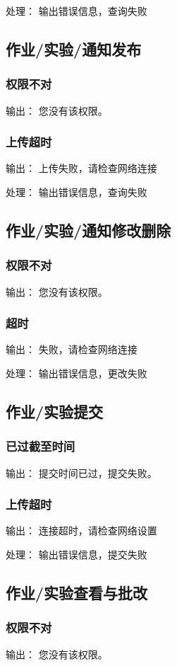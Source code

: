 处理： 输出错误信息，查询失败

\subsection{作业/实验/通知发布}
\subsubsection{权限不对}
输出： 您没有该权限。
\subsubsection{上传超时}
输出： 上传失败，请检查网络连接

处理： 输出错误信息，查询失败

\subsection{作业/实验/通知修改删除}
\subsubsection{权限不对}
输出： 您没有该权限。
\subsubsection{超时}
输出： 失败，请检查网络连接

处理： 输出错误信息，更改失败

\subsection{作业/实验提交}
\subsubsection{已过截至时间}
输出： 提交时间已过，提交失败。
\subsubsection{上传超时}
输出： 连接超时，请检查网络设置

处理： 输出错误信息，提交失败

\subsection{作业/实验查看与批改}
\subsubsection{权限不对}
输出： 您没有该权限。
